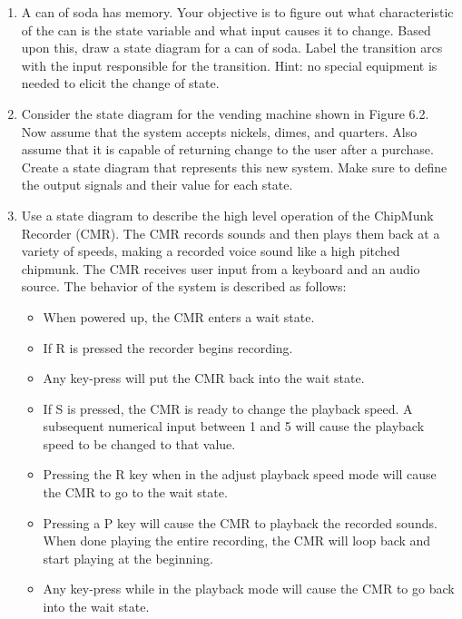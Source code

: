\begin{enumerate}
  \item
    A can of soda has memory. Your objective is to figure out what
    characteristic of the can is the state variable and what input
    causes it to change. Based upon this, draw a state diagram for a can
    of soda. Label the transition arcs with the input responsible for
    the transition. Hint: no special equipment is needed to elicit the
    change of state.
  \item
    Consider the state diagram for the vending machine shown in Figure
    6.2. Now assume that the system accepts nickels, dimes, and
    quarters. Also assume that it is capable of returning change to the
    user after a purchase. Create a state diagram that represents this
    new system. Make sure to define the output signals and their value
    for each state.
  \item
    Use a state diagram to describe the high level operation of the
    ChipMunk Recorder (CMR). The CMR records sounds and then plays them
    back at a variety of speeds, making a recorded voice sound like a
    high pitched chipmunk. The CMR receives user input from a keyboard
    and an audio source. The behavior of the system is described as
    follows:

\begin{itemize}
\item
  When powered up, the CMR enters a wait state.
\item
  If \textquotesingle R\textquotesingle{} is pressed the recorder begins
  recording.
\item
  Any key-press will put the CMR back into the wait state.
\item
  If \textquotesingle S\textquotesingle{} is pressed, the CMR is ready
  to change the playback speed. A subsequent numerical input between 1
  and 5 will cause the playback speed to be changed to that value.
\item
  Pressing the \textquotesingle R\textquotesingle{} key when in the
  adjust playback speed mode will cause the CMR to go to the wait state.
\item
  Pressing a \textquotesingle P\textquotesingle{} key will cause the CMR
  to playback the recorded sounds. When done playing the entire
  recording, the CMR will loop back and start playing at the beginning.
\item
  Any key-press while in the playback mode will cause the CMR to go back
  into the wait state.
\end{itemize}


\end{enumerate}
